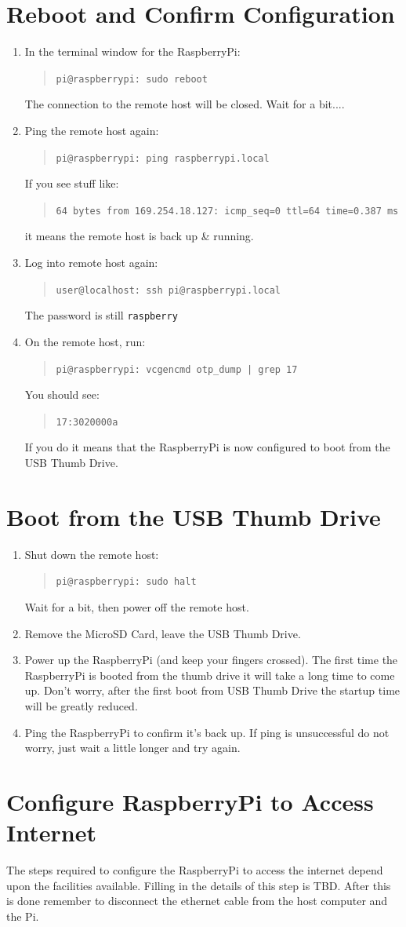 \documentclass[11pt,oneside]{article}
\makeatletter
\newcommand{\localCommand}[1]{\begin{quote} \texttt{user@localhost: #1} \end{quote}}
\newcommand{\remoteCommandBeforeRename}[1]{\begin{quote} \texttt{pi@raspberrypi: #1} \end{quote}}
\newcommand{\xtermPartialOutput}[1]{\begin{verse} \texttt{#1} \end{verse}}
\makeatother
\begin{document}
\section{Reboot and Confirm Configuration} \label{sect:thumbBootConfirm}
\begin{enumerate}
	\item In the terminal window for the RaspberryPi: \remoteCommandBeforeRename{sudo reboot}
	The connection to the remote host will be closed.  Wait for a bit....
	\item Ping the remote host again: \remoteCommandBeforeRename{ping raspberrypi.local}
	If you see stuff like: \xtermPartialOutput{64 bytes from 169.254.18.127: icmp\_seq=0 ttl=64 time=0.387 ms} it means the remote host is back up \& running.
	\item Log into remote host again: \localCommand{ssh pi@raspberrypi.local}
	The password is still \texttt{raspberry}
	\item On the remote host, run: \remoteCommandBeforeRename{vcgencmd otp\_dump | grep 17}
	You should see: \xtermPartialOutput{17:3020000a}
	If you do it means that the RaspberryPi is now configured to boot from the USB Thumb Drive.
\end{enumerate}

\section{Boot from the USB Thumb Drive} \label{sect:thumbBoot}
\begin{enumerate}
	\item Shut down the remote host: \remoteCommandBeforeRename{sudo halt}
	Wait for a bit, then power off the remote host.
	\item Remove the MicroSD Card, leave the USB Thumb Drive.
	\item Power up the RaspberryPi (and keep your fingers crossed).
	The first time the RaspberryPi is booted from the thumb drive it will take a long time to come up.  Don't worry, after the first boot from USB Thumb Drive the startup time will be greatly reduced.
	\item Ping the RaspberryPi to confirm it's back up.  If ping is unsuccessful do not worry, just wait a little longer and try again.
\end{enumerate}

\section{Configure RaspberryPi to Access Internet} \label{sect:raspberryPiAccessInternet}
The steps required to configure the RaspberryPi to access the internet depend upon the facilities available.  Filling in the details of this step is TBD.
After this is done remember to disconnect the ethernet cable from the host computer and the Pi.
\end{document}
